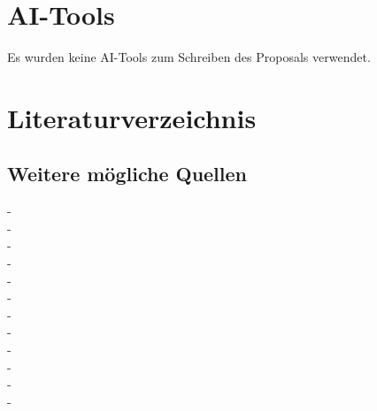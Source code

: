 \documentclass[12pt,a4paper]{article}        %
\begin{document}
\section{AI-Tools}
Es wurden keine AI-Tools zum Schreiben des Proposals verwendet.

\pagebreak
\section{Literaturverzeichnis}

\subsection{Weitere mögliche Quellen}

- \cite{antos_web_2019} \\
- \cite{bontridder_role_2021} \\
- \cite{brill_death_2024} \\
- \cite{fernandes_post-factual_2022} \\
- \cite{kertysova_artificial_2018} \\
- \cite{latzer_vertrauen_2023} \\
- \cite{montasari_artificial_2022} \\
- \cite{reuter_fake_2019} \\
- \cite{wahl_fake_2021} \\
- \cite{dander_fake_2020} \\
- \cite{waller_jamesfocus_2019} \\
- \cite{zoglauer_konstruierte_2021} \\

\printbibliography
\end{document}
